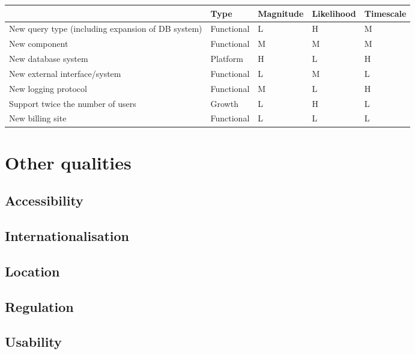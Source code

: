 \begin{table}[ht]
    \centering
    \begin{tabular}{| p{5cm} | l | l | l | l |}
            & Type & Magnitude & Likelihood & Timescale \\ \hline \hline
        New query type (including expansion of DB system) & Functional & L & H
            & M \\ \hline New component & Functional & M & M & M \\ \hline
        New database system & Platform & H & L & H \\ \hline
        New external interface/system & Functional & L & M & L \\ \hline
        New logging protocol & Functional & M & L & H \\ \hline
        Support twice the number of users & Growth & L & H & L \\ \hline
        New billing site & Functional & L & L & L \\ \hline
    \end{tabular}
    \label{tab:evolution}
\end{table}


\section{Other qualities}
\label{sec:other-qualities}

\subsection{Accessibility}
\label{sec:accessibility}


\subsection{Internationalisation}
\label{sec:internationalisation}


\subsection{Location}
\label{sec:location}


\subsection{Regulation}
\label{sec:regulation}


\subsection{Usability}
\label{sec:usability}


